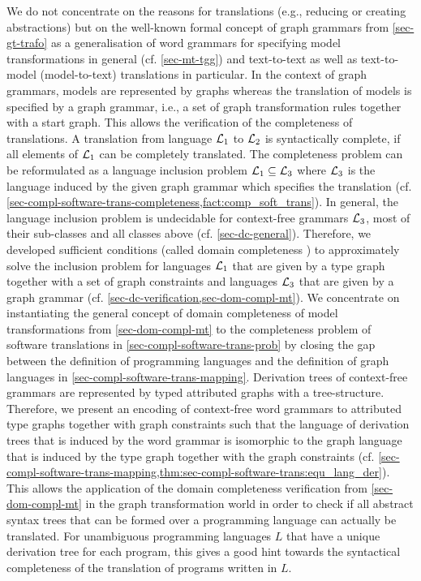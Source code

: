 We do not concentrate on the reasons for translations (e.g., reducing or creating abstractions) but on the well-known formal concept of graph grammars \cite{Ehrig:2006:FAG:1121741} from \cref{sec-gt-trafo} as a generalisation of word grammars for specifying model transformations \cite{FAGT2,Mens2006125,118} in general (cf. \cref{sec-mt-tgg}) and text-to-text \cite{DBLP:conf/staf/0001NBEG14} as well as text-to-model (model-to-text) translations in particular.
In the context of graph grammars, models are represented by graphs whereas the translation of models is specified by a graph grammar, i.e., a set of graph transformation rules together with a start graph.
This allows the verification of the completeness of translations.
A translation from language $\mathcal{L}_1$ to $\mathcal{L}_2$ is syntactically complete, if all elements of $\mathcal{L}_1$ can be completely translated.
The completeness problem can be reformulated as a language inclusion problem $\mathcal{L}_1 \subseteq \mathcal{L}_3$ where $\mathcal{L}_3$ is the language induced by the given graph grammar which specifies the translation (cf. \cref{sec-compl-software-trans-completeness,fact:comp_soft_trans}).
In general, the language inclusion problem is undecidable for context-free grammars $\mathcal{L}_3$, most of their sub-classes and all classes above \cite{Asveld2000247} (cf. \cref{sec-dc-general}).
Therefore, we developed sufficient conditions (called domain completeness \cite{DBLP:conf/staf/Nachtigall0BE14}) to approximately solve the inclusion problem for languages $\mathcal{L}_1$ that are given by a type graph \cite{DBLP:journals/tcs/GolasLEO12} together with a set of graph constraints \cite{DBLP:conf/birthday/HabelP05,FAGT2} and languages $\mathcal{L}_3$ that are given by a graph grammar (cf. \cref{sec-dc-verification,sec-dom-compl-mt}).
We concentrate on instantiating the general concept of domain completeness of model transformations from \cref{sec-dom-compl-mt} to the completeness problem of software translations in \cref{sec-compl-software-trans-prob} by closing the gap between the definition of programming languages and the definition of graph languages in \cref{sec-compl-software-trans-mapping}.
Derivation trees of context-free grammars are represented by typed attributed graphs \cite{DBLP:journals/tcs/GolasLEO12} with a tree-structure.
Therefore, we present an encoding of context-free word grammars to attributed type graphs together with graph constraints such that the language of derivation trees that is induced by the word grammar is isomorphic to the graph language that is induced by the type graph together with the graph constraints (cf. \cref{sec-compl-software-trans-mapping,thm:sec-compl-software-trans:equ_lang_der}).
This allows the application of the domain completeness verification from \cref{sec-dom-compl-mt} in the graph transformation world in order to check if all abstract syntax trees that can be formed over a programming language can actually be translated. 
For unambiguous programming languages $L$ \cite{DBLP:books/daglib/0011126} that have a unique derivation tree for each program, this gives a good hint towards the syntactical completeness of the translation of programs written in $L$.

